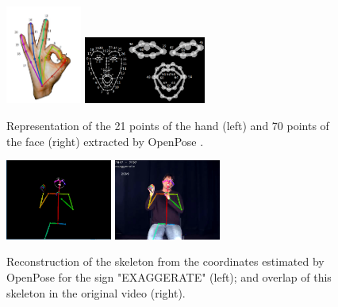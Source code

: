 

\begin{figure}[ht]
    \centering
    \includegraphics[width=2.5cm]{images/keypoints_hand}
    \includegraphics[width=4cm]{images/keypoints_face}
    \caption{Representation of the 21 points of the hand (left) and 70 points of the face (right) extracted by OpenPose \cite{openpose-output-2018}.}
    \label{fig:keypoints-face-hand}
\end{figure}

\begin{figure}[ht]
    \centering
    \includegraphics[width=3.5cm]{images/sign_pose}
    \includegraphics[width=3.5cm]{images/sign_pose_blended}
    \caption{Reconstruction of the skeleton from the coordinates estimated by OpenPose for the sign "EXAGGERATE" (left); and overlap of this skeleton in the original video (right).}
    \label{fig:sign-pose}
\end{figure}

